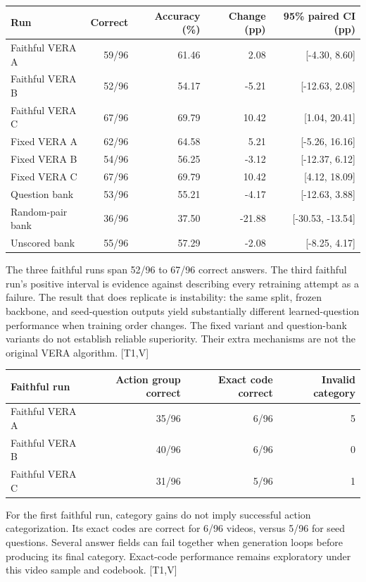 \documentclass[11pt]{article}
\newcommand{\src}[1]{\textsf{[#1]}}
\begin{document}
\begin{center}\small
\begin{tabular}{@{}lrrrr@{}}\toprule
Run & Correct & Accuracy (\%) & Change (pp) & 95\% paired CI (pp)\\\midrule
Faithful VERA A & 59/96 & 61.46 & 2.08 & [-4.30, 8.60] \\
Faithful VERA B & 52/96 & 54.17 & -5.21 & [-12.63, 2.08] \\
Faithful VERA C & 67/96 & 69.79 & 10.42 & [1.04, 20.41] \\
Fixed VERA A & 62/96 & 64.58 & 5.21 & [-5.26, 16.16] \\
Fixed VERA B & 54/96 & 56.25 & -3.12 & [-12.37, 6.12] \\
Fixed VERA C & 67/96 & 69.79 & 10.42 & [4.12, 18.09] \\
Question bank & 53/96 & 55.21 & -4.17 & [-12.63, 3.88] \\
Random-pair bank & 36/96 & 37.50 & -21.88 & [-30.53, -13.54] \\
Unscored bank & 55/96 & 57.29 & -2.08 & [-8.25, 4.17] \\
\bottomrule\end{tabular}
\end{center}

The three faithful runs span 52/96 to 67/96 correct answers. The third faithful run's positive interval is evidence against describing every retraining attempt as a failure. The result that does replicate is instability: the same split, frozen backbone, and seed-question outputs yield substantially different learned-question performance when training order changes. The fixed variant and question-bank variants do not establish reliable superiority. Their extra mechanisms are not the original VERA algorithm. \src{T1,V}

\begin{center}\small\begin{tabular}{@{}lrrr@{}}\toprule
Faithful run & Action group correct & Exact code correct & Invalid category\\\midrule
Faithful VERA A & 35/96 & 6/96 & 5 \\
Faithful VERA B & 40/96 & 6/96 & 0 \\
Faithful VERA C & 31/96 & 5/96 & 1 \\
\bottomrule\end{tabular}\end{center}
For the first faithful run, category gains do not imply successful action categorization. Its exact codes are correct for 6/96 videos, versus 5/96 for seed questions. Several answer fields can fail together when generation loops before producing its final category. Exact-code performance remains exploratory under this video sample and codebook. \src{T1,V}
\end{document}
